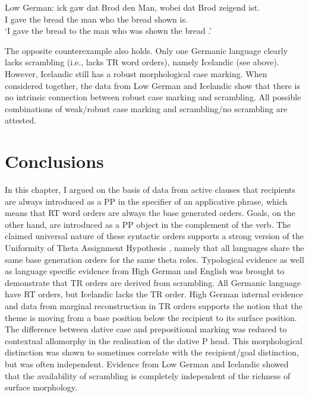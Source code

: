 \begin{exe}
	 Low German:
	\gll ick gaw dat Brod den Man, wobei dat Brod zeigend ist.\\
	I gave the bread the man who the bread shown is.\\
	\trans `I gave the bread to the man who was shown the bread \citep{Mussaus.1829}.'
\end{exe}

The opposite counterexample also holds. Only one Germanic language clearly lacks scrambling (i.e., lacks TR word orders), namely Icelandic (see above). However, Icelandic still has a robust morphological case marking. When considered together, the data from Low German and Icelandic show that there is no intrinsic connection between robust case marking and scrambling. All possible combinations of weak/robust case marking and scrambling/no scrambling are attested.

\section{Conclusions}
In this chapter, I argued on the basis of data from active clauses that recipients are always introduced as a PP in the specifier of an applicative phrase, which means that RT word orders are always the base generated orders. Goals, on the other hand, are introduced as a PP object in the complement of the verb. The claimed universal nature of these syntactic orders supports a strong version of the Uniformity of Theta Assignment Hypothesis \citep{Baker.1988}, namely that all languages share the same base generation orders for the same theta roles.
	Typological evidence as well as language specific evidence from High German and English was brought to demonstrate that TR orders are derived from scrambling. All Germanic language have RT orders, but Icelandic lacks the TR order. High German internal evidence and data from marginal reconstruction in TR orders supports the notion that the theme is moving from a base position below the recipient to its surface position.
	The difference between dative case and prepositional marking was reduced to contextual allomorphy in the realisation of the dative P head. This morphological distinction was shown to sometimes correlate with the recipient/goal distinction, but was often independent. Evidence from Low German and Icelandic showed that the availability of scrambling is completely independent of the richness of surface morphology.

%
